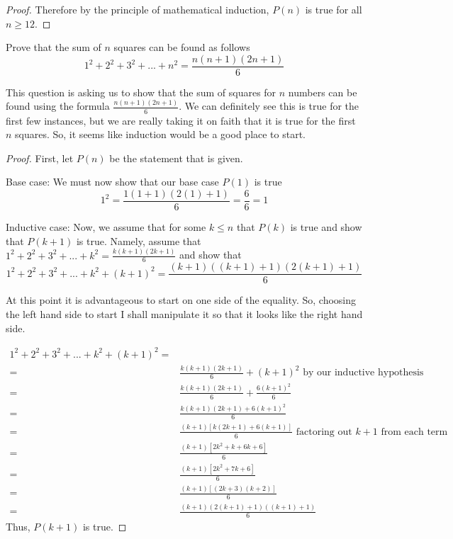 \begin{questions}
\begin{solution}
\begin{proof}
    Therefore by the principle of mathematical induction, $P(n)$ is true for all $n \ge 12$.
  \end{proof}
\end{solution}

\question Prove that the sum of $n$ squares can be found as follows\[1^2 +2^2 +3^2+...+n^2 = \frac{n(n+1)(2n+1)}{6}\]
\begin{solution}
This question is asking us to show that the sum of squares for $n$ numbers can be found using the formula $\frac{n(n+1)(2n+1)}{6}$. We can definitely see this is true for the first few instances, but we are really taking it on faith that it is true for the first $n$ squares. So, it seems like induction would be a good place to start.
\begin{proof}
First, let $P(n)$ be the statement that is given.

Base case: We must now show that our base case $P(1)$ is true \[1^2 = \frac{1(1+1)(2(1)+1)}{6} = \frac{6}{6} =1\]

Inductive case: Now, we assume that for some $k\leq n$ that $P(k)$ is true and show that $P(k+1)$ is true. Namely, assume that $1^2 +2^2 +3^2+...+k^2 = \frac{k(k+1)(2k+1)}{6}$ and show that \[1^2 +2^2 +3^2+...+k^2+{(k+1)}^2 = \frac{(k+1)((k+1)+1)(2(k+1)+1)}{6}\]

At this point it is advantageous to start on one side of the equality. So, choosing the left hand side to start I shall manipulate it so that it looks like the right hand side.

\begin{align*}
1^2 +2^2 +3^2+...+k^2+{(k+1)}^2 = \\
= & \frac{k(k+1)(2k+1)}{6} +(k+1)^2 \mbox{ by our inductive hypothesis}\\
= & \frac{k(k+1)(2k+1)}{6} +\frac{6(k+1)^2}{6} \\
= & \frac{k(k+1)(2k+1)+6(k+1)^2}{6} \\
= & \frac{(k+1)[k(2k+1)+6(k+1)]}{6} \mbox{ factoring out $k+1$ from each term}\\
= & \frac{(k+1)[2k^2+k+6k+6]}{6}\\
= & \frac{(k+1)[2k^2+7k+6]}{6}\\
= & \frac{(k+1)[(2k+3)(k+2)]}{6}\\
= & \frac{(k+1)(2(k+1)+1)((k+1)+1)}{6}
\end{align*}
Thus, $P(k+1)$ is true.


\end{proof}
\end{solution}
\end{questions}
